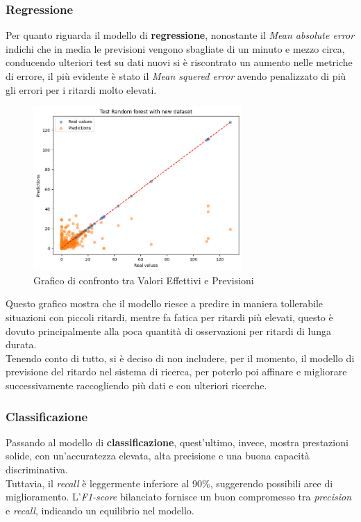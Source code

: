 \documentclass[italian,12pt,a4paper]{article}
\begin{document}
			\subsubsection{Regressione}
				Per quanto riguarda il modello di \textbf{regressione}, nonostante il \textit{Mean absolute error} indichi che in media le previsioni vengono sbagliate di un minuto e mezzo circa, conducendo ulteriori test su dati nuovi si è riscontrato un aumento nelle metriche di errore, il più evidente è stato il \textit{Mean squered error} avendo penalizzato di più gli errori per i ritardi molto elevati.
				
				\begin{figure}[h]
					\centering
					\includegraphics[width=300px]{img/reg_plot}
					\caption{Grafico di confronto tra Valori Effettivi e Previsioni}
				\end{figure}
				
				Questo grafico mostra che il modello riesce a predire in maniera tollerabile situazioni con piccoli ritardi, mentre fa fatica per ritardi più elevati, questo è dovuto principalmente alla poca quantità di osservazioni per ritardi di lunga durata.\\
				\linebreak
				Tenendo conto di tutto, si è deciso di non includere, per il momento, il modello di previsione del ritardo nel sistema di ricerca, per poterlo poi affinare e migliorare successivamente raccogliendo più dati e con ulteriori ricerche.
			
			\subsubsection{Classificazione}
				Passando al modello di \textbf{classificazione}, quest'ultimo, invece, mostra prestazioni solide, con un'accuratezza elevata, alta precisione e una buona capacità discriminativa.\\
				\linebreak
				Tuttavia, il \textit{recall} è leggermente inferiore al 90\%, suggerendo possibili aree di miglioramento. L'\textit{F1-score} bilanciato fornisce un buon compromesso tra \textit{precision} e \textit{recall}, indicando un equilibrio nel modello.\\
				
\end{document}
